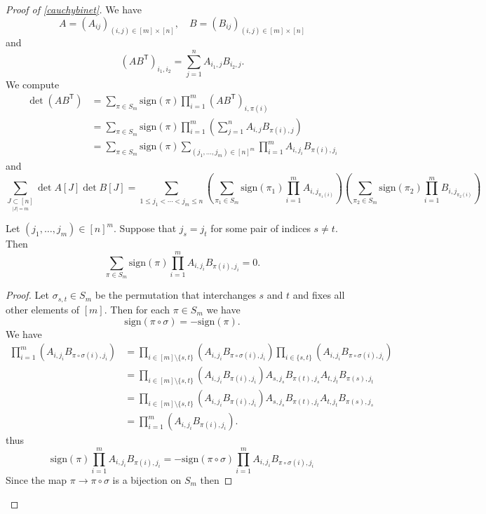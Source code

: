 \begin{proof}[Proof of \ref{cauchybinet}]
We have
$$
A=(A_{ij})_{(i,j)\in[m]\times[n]},\quad B=(B_{ij})_{(i,j)\in[m]\times[n]}
$$
and 
$$
(AB^{\mathsf{T}})_{i_{1},i_{2}}=\sum _{j=1}^{n}A_{i_{1},j}B_{i_{2},j}.
$$
We compute 
\begin{align*}
\det(AB^{\mathsf{T}}) & =\sum _{\pi \in S_{m}}\mathrm{sign}(\pi)\prod_{i=1}^{m} (AB^{\mathsf{T}})_{i,\pi(i)} \\
 & =\sum _{\pi \in S_{m}}\mathrm{sign}(\pi)\prod_{i=1}^{m} \left( \sum_{j=1}^{n} A_{i,j}B_{\pi(i),j} \right) \\
 & =\sum _{\pi \in S_{m}}\mathrm{sign}(\pi)\sum _{(j_{1},\dots,j_{m})\in[n]^{m}}\prod_{i=1}^{m} A_{i,j_{i}}B_{\pi(i),j_{i}}
\end{align*}
and
$$
\sum _{\underset{|J|=m}{J\subset[n]}}\det A[J]\det B[J]=\sum _{1\le j_{1}<\cdots<j_{m}\le n} \left( \sum _{\pi_{1}\in S_{m}}\mathrm{sign}(\pi _{1})\prod_{i=1}^{m} A_{i,j_{\pi_{1}(i)}}\right)\left( \sum _{\pi_{2}\in S_{m}}\mathrm{sign}(\pi_{2})\prod_{i=1}^{m}B_{i,j_{\pi_{2}(i)}}  \right)
$$
\begin{lemma}
Let $(j_{1},\dots,j_{m})\in [n]^{m}$. Suppose that $j_{s}=j_{t}$ for some pair of indices $s\neq t$. Then
$$
\sum _{\pi \in S_{m}}\mathrm{sign}(\pi)\prod_{i=1}^{m} A_{i,j_{i}}B_{\pi(i),j_{i}}=0.
$$
\end{lemma}
\begin{proof}
Let $\sigma _{s,t}\in S_{m}$ be the permutation that interchanges $s$ and $t$ and fixes all other elements of $[m]$. Then for each $\pi \in S_{m}$ we have
$$
\mathrm{sign}(\pi \circ\sigma)=-\mathrm{sign}(\pi).
$$
We have
\begin{align*}
\prod_{i=1}^{m} (A_{i,j_{i}}B_{\pi \circ\sigma(i),j_{i}}) & =\prod _{i\in[m]\setminus \{ s,t \}} (A_{i,j_{i}}B_{\pi \circ\sigma(i),j_{i}})\prod _{i\in \{ s,t \}}(A_{i,j_{i}}B_{\pi \circ\sigma (i),j_{i}}) \\
 & =\prod _{i\in[m]\setminus \{ s,t \}}(A_{i,j_{i}}B_{\pi(i),j_{i}})A_{s,j_{s}} B_{\pi(t),j_{s}}A_{t,j_{t} }B_{\pi(s),j_{t}} \\
 & =\prod _{i\in[m]\setminus \{ s,t \} } (A_{i,j_{i}}B_{\pi(i),j_{i}})A_{s,j_{s}}B_{\pi(t),j_{t}}A_{t,j_{t}}B_{\pi(s),j_{s}} \\
 & =\prod_{i=1}^{m}(A_{i,j_{i}}B_{\pi(i),j_{i}}). 
\end{align*}
thus
$$
\mathrm{sign}(\pi)\prod_{i=1}^{m} A_{i,j_{i}}B_{\pi(i),j_{i}}=-\mathrm{sign}(\pi \circ\sigma)\prod_{i=1}^{m} A_{i,j_{i}}B_{\pi \circ\sigma(i),j_{i}}
$$
Since the map $\pi \to \pi \circ\sigma$ is a bijection on $S_{m}$ then

\end{proof}
\end{proof}
